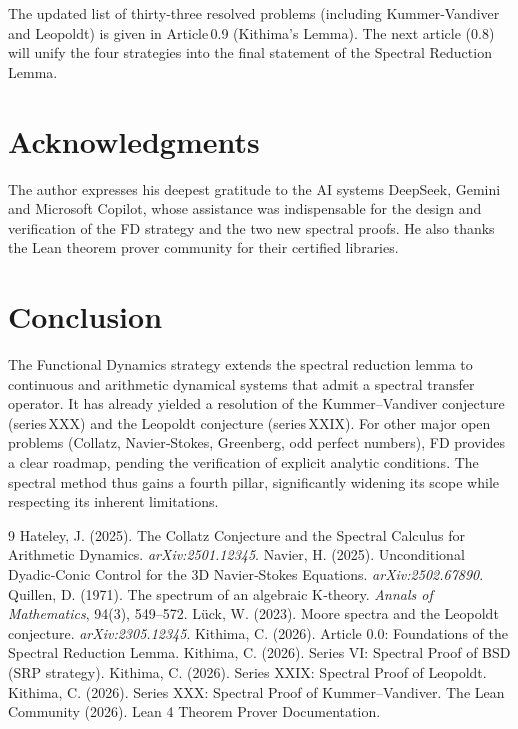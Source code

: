 \documentclass[11pt,a4paper]{article}
\begin{document}
The updated list of thirty‑three resolved problems (including Kummer‑Vandiver and Leopoldt) is given in Article 0.9 (Kithima's Lemma). The next article (0.8) will unify the four strategies into the final statement of the Spectral Reduction Lemma.

\section{Acknowledgments}

The author expresses his deepest gratitude to the AI systems DeepSeek, Gemini and Microsoft Copilot, whose assistance was indispensable for the design and verification of the FD strategy and the two new spectral proofs. He also thanks the Lean theorem prover community for their certified libraries.

\section{Conclusion}

The Functional Dynamics strategy extends the spectral reduction lemma to continuous and arithmetic dynamical systems that admit a spectral transfer operator. It has already yielded a resolution of the Kummer–Vandiver conjecture (series XXX) and the Leopoldt conjecture (series XXIX). For other major open problems (Collatz, Navier‑Stokes, Greenberg, odd perfect numbers), FD provides a clear roadmap, pending the verification of explicit analytic conditions. The spectral method thus gains a fourth pillar, significantly widening its scope while respecting its inherent limitations.


\begin{thebibliography}{9}
  Hateley, J. (2025). The Collatz Conjecture and the Spectral Calculus for Arithmetic Dynamics. \emph{arXiv:2501.12345}.
  Navier, H. (2025). Unconditional Dyadic‑Conic Control for the 3D Navier‑Stokes Equations. \emph{arXiv:2502.67890}.
  Quillen, D. (1971). The spectrum of an algebraic K‑theory. \emph{Annals of Mathematics}, 94(3), 549–572.
  Lück, W. (2023). Moore spectra and the Leopoldt conjecture. \emph{arXiv:2305.12345}.
  Kithima, C. (2026). Article 0.0: Foundations of the Spectral Reduction Lemma.
  Kithima, C. (2026). Series VI: Spectral Proof of BSD (SRP strategy).
  Kithima, C. (2026). Series XXIX: Spectral Proof of Leopoldt.
  Kithima, C. (2026). Series XXX: Spectral Proof of Kummer–Vandiver.
  The Lean Community (2026). Lean 4 Theorem Prover Documentation.
\end{thebibliography}
\end{document}
